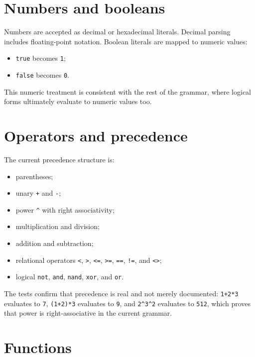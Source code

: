 \section{Numbers and booleans}
\label{sec:expression-reference-numbers-booleans}

Numbers are accepted as decimal or hexadecimal literals. Decimal parsing
includes floating-point notation. Boolean literals are mapped to numeric
values:
\begin{itemize}
\item \texttt{true} becomes \texttt{1};
\item \texttt{false} becomes \texttt{0}.
\end{itemize}

This numeric treatment is consistent with the rest of the grammar, where
logical forms ultimately evaluate to numeric values too.

\section{Operators and precedence}
\label{sec:expression-reference-operators}

The current precedence structure is:
\begin{itemize}
\item parentheses;
\item unary \texttt{+} and \texttt{-};
\item power \texttt{\^{}} with right associativity;
\item multiplication and division;
\item addition and subtraction;
\item relational operators \texttt{<}, \texttt{>}, \texttt{<=},
      \texttt{>=}, \texttt{==}, \texttt{!=}, and \texttt{<>};
\item logical \texttt{not}, \texttt{and}, \texttt{nand}, \texttt{xor}, and
      \texttt{or}.
\end{itemize}

The tests confirm that precedence is real and not merely documented:
\texttt{1+2*3} evaluates to \texttt{7}, \texttt{(1+2)*3} evaluates to
\texttt{9}, and \verb|2^3^2| evaluates to \texttt{512}, which proves that
power is right-associative in the current grammar.

\section{Functions}
\label{sec:expression-reference-functions}

